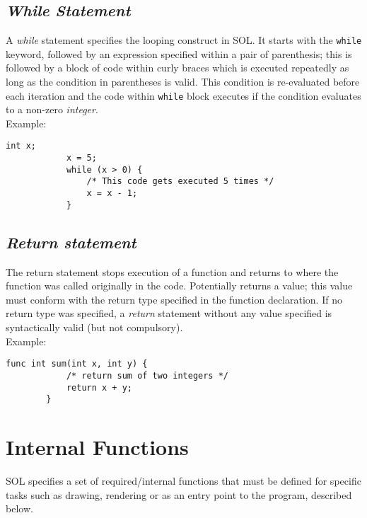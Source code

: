     \subsection{\textit{While Statement}}
    A \textit{while} statement specifies the looping construct in SOL. It starts with the \texttt{while} keyword, followed by an expression specified within a pair of parenthesis; this is followed by a block of code within curly braces which is executed repeatedly as long as the condition in parentheses is valid. This condition is re-evaluated before each iteration and the code within \texttt{while} block executes if the condition evaluates to a non-zero \textit{integer}. \\
    Example:\\
    \begin{lstlisting}[style=sol]
            int x;
            x = 5;
            while (x > 0) {
                /* This code gets executed 5 times */
                x = x - 1;
            }
        \end{lstlisting}

    \subsection{\textit{Return statement}}
    The return statement stops execution of a function and returns to where the function was called originally in the code. Potentially returns a value; this value must conform with the return type specified in the function declaration. If no return type was specified, a \textit{return} statement without any value specified is syntactically valid (but not compulsory).\\
    Example:\\
    \begin{lstlisting}[style=sol]
        func int sum(int x, int y) {
            /* return sum of two integers */
            return x + y;
        }
    \end{lstlisting}
    
\section{Internal Functions} \label{internal}
SOL specifies a set of required/internal functions that must be defined for specific tasks such as drawing, rendering or as an entry point to the program, described below.

